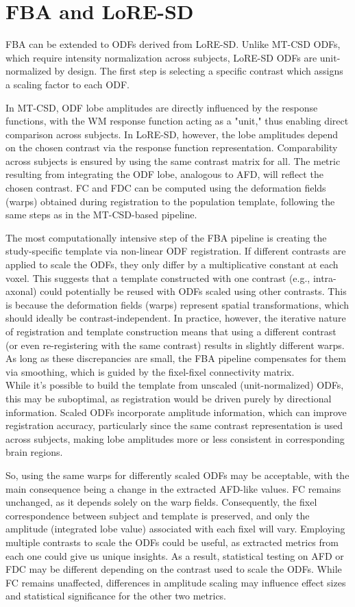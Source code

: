 \section{FBA and LoRE-SD}
FBA can be extended to ODFs derived from LoRE-SD. Unlike MT-CSD ODFs, which require intensity normalization across subjects, LoRE-SD ODFs are unit-normalized by design. The first step is selecting a specific contrast which assigns a scaling factor to each ODF.

In MT-CSD, ODF lobe amplitudes are directly influenced by the response functions, with the WM response function acting as a "unit," thus enabling direct comparison across subjects. In LoRE-SD, however, the lobe amplitudes depend on the chosen contrast via the response function representation. Comparability across subjects is ensured by using the same contrast matrix for all. The metric resulting from integrating the ODF lobe, analogous to AFD, will reflect the chosen contrast. FC and FDC can be computed using the deformation fields (warps) obtained during registration to the population template, following the same steps as in the MT-CSD-based pipeline.

The most computationally intensive step of the FBA pipeline is creating the study-specific template via non-linear ODF registration. If different contrasts are applied to scale the ODFs, they only differ by a multiplicative constant at each voxel. This suggests that a template constructed with one contrast (e.g., intra-axonal) could potentially be reused with ODFs scaled using other contrasts. This is because the deformation fields (warps) represent spatial transformations, which should ideally be contrast-independent. In practice, however, the iterative nature of registration and template construction means that using a different contrast (or even re-registering with the same contrast) results in slightly different warps. As long as these discrepancies are small, the FBA pipeline compensates for them via smoothing, which is guided by the fixel-fixel connectivity matrix.\\ While it's possible to build the template from unscaled (unit-normalized) ODFs, this may be suboptimal, as registration would be driven purely by directional information. Scaled ODFs incorporate amplitude information, which can improve registration accuracy, particularly since the same contrast representation is used across subjects, making lobe amplitudes more or less consistent in corresponding brain regions.

So, using the same warps for differently scaled ODFs may be acceptable, with the main consequence being a change in the extracted AFD-like values. FC remains unchanged, as it depends solely on the warp fields. Consequently, the fixel correspondence between subject and template is preserved, and only the amplitude (integrated lobe value) associated with each fixel will vary. Employing multiple contrasts to scale the ODFs could be useful, as extracted metrics from each one could give us unique insights. As a result, statistical testing on AFD or FDC may be different depending on the contrast used to scale the ODFs. While FC remains unaffected, differences in amplitude scaling may influence effect sizes and statistical significance for the other two metrics.

